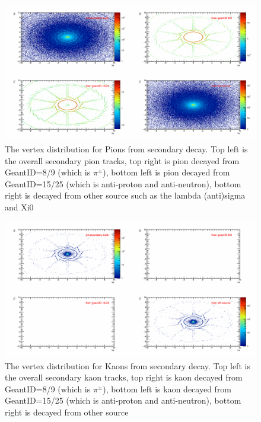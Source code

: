 \begin{figure}[htbp]
\centering
\includegraphics[keepaspectratio,width=1.0\textwidth,angle=0]{figure/Run14_D0HFT/Vtx_Pion.png}
\caption{The vertex distribution for Pions from secondary decay. Top left is the overall secondary pion tracks, top right is pion decayed from GeantID=8/9 (which is $\pi^{\pm}$), bottom left is pion decayed from GeantID=15/25 (which is anti-proton and anti-neutron), bottom right is decayed from other source such as the lambda (anti)sigma and Xi0}
\label{Vtx_Pion}
\end{figure}

\begin{figure}[htbp]
\centering
\includegraphics[keepaspectratio,width=1.0\textwidth,angle=0]{figure/Run14_D0HFT/Vtx_Kaon.png}
\caption{The vertex distribution for Kaons from secondary decay. Top left is the overall secondary kaon tracks, top right is kaon decayed from GeantID=8/9 (which is $\pi^{\pm}$), bottom left is kaon decayed from GeantID=15/25 (which is anti-proton and anti-neutron), bottom right is decayed from other source}
\label{Vtx_Kaon}
\end{figure}


